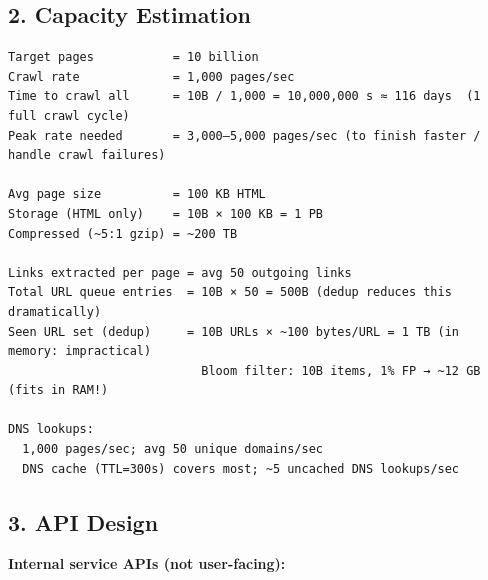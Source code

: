 \documentclass[11pt]{article}
\begin{document}
\subsection{2. Capacity Estimation}\label{2-capacity-estimation-3}

\setcodelang{}

\begin{verbatim}
Target pages           = 10 billion
Crawl rate             = 1,000 pages/sec
Time to crawl all      = 10B / 1,000 = 10,000,000 s ≈ 116 days  (1 full crawl cycle)
Peak rate needed       = 3,000–5,000 pages/sec (to finish faster / handle crawl failures)

Avg page size          = 100 KB HTML
Storage (HTML only)    = 10B × 100 KB = 1 PB
Compressed (~5:1 gzip) = ~200 TB

Links extracted per page = avg 50 outgoing links
Total URL queue entries  = 10B × 50 = 500B (dedup reduces this dramatically)
Seen URL set (dedup)     = 10B URLs × ~100 bytes/URL = 1 TB (in memory: impractical)
                           Bloom filter: 10B items, 1% FP → ~12 GB (fits in RAM!)

DNS lookups:
  1,000 pages/sec; avg 50 unique domains/sec
  DNS cache (TTL=300s) covers most; ~5 uncached DNS lookups/sec
\end{verbatim}

\subsection{3. API Design}\label{3-api-design-3}

\textbf{Internal service APIs (not user-facing):}

\end{document}
